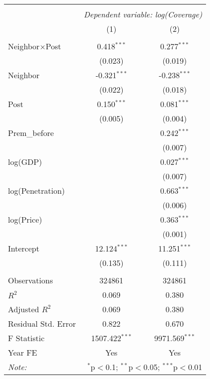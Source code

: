 
\begin{tabular}{@{\extracolsep{5pt}}lcc}
\\[-1.8ex]\hline
\hline \\[-1.8ex]
& \multicolumn{2}{c}{\textit{Dependent variable: log(Coverage)}} \
\cr \cline{2-3}
\\[-1.8ex] & (1) & (2) \\
\hline \\[-1.8ex]
 Neighbor$\times$Post & 0.418$^{***}$ & 0.277$^{***}$ \\
& (0.023) & (0.019) \\
Neighbor & -0.321$^{***}$ & -0.238$^{***}$ \\
& (0.022) & (0.018) \\
 Post & 0.150$^{***}$ & 0.081$^{***}$ \\
& (0.005) & (0.004) \\
 Prem\_before & & 0.242$^{***}$ \\
& & (0.007) \\
 log(GDP) & & 0.027$^{***}$ \\
& & (0.007) \\
 log(Penetration) & & 0.663$^{***}$ \\
& & (0.006) \\
 log(Price) & & 0.363$^{***}$ \\
& & (0.001) \\
Intercept & 12.124$^{***}$ & 11.251$^{***}$ \\
& (0.135) & (0.111) \\
\hline \\[-1.8ex]
 Observations & 324861 & 324861 \\
 $R^2$ & 0.069 & 0.380 \\
 Adjusted $R^2$ & 0.069 & 0.380 \\
 Residual Std. Error & 0.822  & 0.670  \\
 F Statistic & 1507.422$^{***}$  & 9971.569$^{***}$  \\
Year FE & Yes & Yes \\
\hline
\hline
\textit{Note:} & \multicolumn{2}{r}{$^{*}$p$<$0.1; $^{**}$p$<$0.05; $^{***}$p$<$0.01} \\
\end{tabular}
